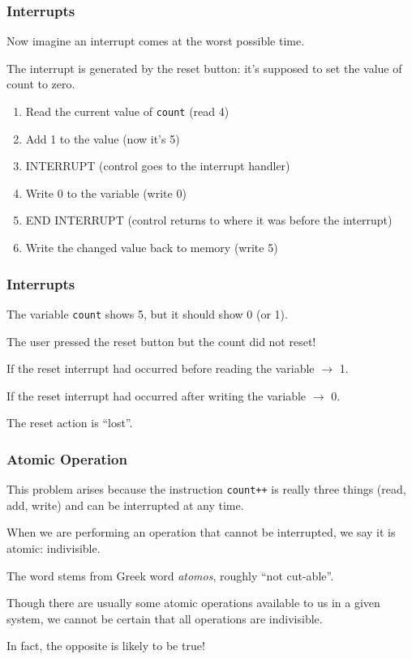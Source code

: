 \begin{frame}
\frametitle{Interrupts}

Now imagine an interrupt comes at the worst possible time. 

The interrupt is generated by the reset button: it's supposed to set the value of count to zero.

\begin{enumerate}
	\item Read the current value of \texttt{count} (read 4)
	\item Add 1 to the value (now it's 5)
	\item INTERRUPT (control goes to the interrupt handler)
	\item Write 0 to the variable (write 0)
	\item END INTERRUPT (control returns to where it was before the interrupt)
	\item Write the changed value back to memory (write 5)
\end{enumerate}

\end{frame}

\begin{frame}
\frametitle{Interrupts}

The variable \texttt{count} shows 5, but it should show 0 (or 1).

The user pressed the reset button but the count did not reset! 

If the reset interrupt had occurred before reading the variable $\rightarrow$ 1.

If the reset interrupt had occurred after writing the variable $\rightarrow$ 0.

The reset action is ``lost''.

\end{frame}

\begin{frame}
\frametitle{Atomic Operation}

This problem arises because the instruction \texttt{count++} is really three things (read, add, write) and can be interrupted at any time. 

When we are performing an operation that cannot be interrupted, we say it is \alert{atomic}: indivisible. 

The word stems from Greek word \textit{atomos}, roughly ``not cut-able''. 

Though there are usually some atomic operations available to us in a given system, we cannot be certain that all operations are indivisible. 

In fact, the opposite is likely to be true!

\end{frame}

